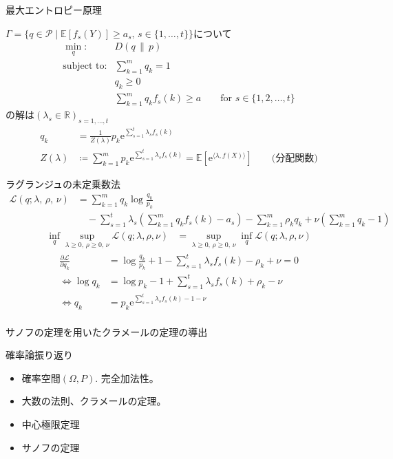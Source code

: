 \documentclass[lualatex,handout]{beamer}
\newcommand{\expt}[1]{\mathbb{E}\left[#1\right]}
\newcommand\KL[2]{D\left(#1\,\|\,#2\right)}
\theoremstyle{definition}
\begin{document}
\begin{frame}{最大エントロピー原理}
\begin{theorem}
$\Gamma=\{q\in\mathcal{P}\mid \expt{f_s(Y)}\ge a_s,\, s\in\{1,\dotsc,t\}\}$について
\begin{align*}
\min_{q}\colon& \KL{q}{p}\\
\text{subject to}\colon& \sum_{k=1}^m q_k = 1\\
&q_k\ge 0\\
&\sum_{k=1}^m q_k f_s(k) \ge a\qquad \text{for } s\in\{1,2,\dotsc,t\} 
\end{align*}
の解は$(\lambda_s\in\mathbb{R})_{s=1,\dotsc,t}$
\begin{align*}
q_k &= \frac1{Z(\lambda)} p_k\mathrm{e}^{\sum_{s=1}^t \lambda_s f_s(k)}\\
Z(\lambda) &\coloneq \sum_{k=1}^m p_k\mathrm{e}^{\sum_{s=1}^t \lambda_s f_s(k)} = \expt{\mathrm{e}^{\langle \lambda, f(X)\rangle}} \qquad \text{(分配関数)}
\end{align*}
\end{theorem}
\end{frame}

\begin{frame}{ラグランジュの未定乗数法}
\begin{align*}
\mathcal{L}(q;\lambda,\,\rho,\,\nu) &= \sum_{k=1}^m q_k\log\frac{q_k}{p_k}\\
&\quad - \sum_{s=1}^t \lambda_s \left(\sum_{k=1}^m q_k f_s(k) - a_s\right) - \sum_{k=1}^m \rho_k q_k + \nu \left(\sum_{k=1}^m q_k - 1\right)
\end{align*}
\begin{align*}
\inf_{q}\sup_{\lambda\ge 0,\, \rho\ge0,\, \nu} \mathcal{L}(q;\lambda,\rho,\nu) &= 
\sup_{\lambda\ge 0,\, \rho\ge0,\, \nu}\inf_{q} \mathcal{L}(q;\lambda,\rho,\nu)
\end{align*}
\begin{align*}
\frac{\partial \mathcal{L}}{\partial q_k} &= \log\frac{q_k}{p_k} + 1 - \sum_{s=1}^t \lambda_s f_s(k) - \rho_k + \nu = 0\\
\iff \log q_k &= \log p_k - 1 + \sum_{s=1}^t \lambda_s f_s(k) + \rho_k - \nu\\
\iff q_k &= p_k \mathrm{e}^{\sum_{s=1}^t \lambda_s f_s(k) - 1 - \nu}\\
\end{align*}
\end{frame}

\begin{frame}{サノフの定理を用いたクラメールの定理の導出}
\end{frame}

\begin{frame}{確率論振り返り}
\begin{itemize}
\setlength{\itemsep}{2em}
\item 確率空間$(\Omega, P)$. 完全加法性。
\item 大数の法則、クラメールの定理。
\item 中心極限定理
\item サノフの定理
\end{itemize}
\end{frame}
\end{document}
